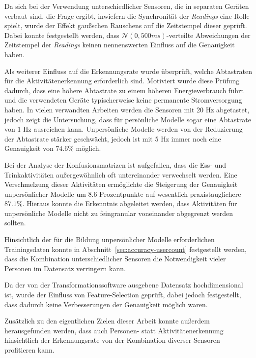 Da sich bei der Verwendung unterschiedlicher Sensoren, die in separaten Geräten verbaut sind, die Frage ergibt, inwiefern die Synchronität der \textit{Readings} eine Rolle spielt, wurde der Effekt gaußschen Rauschens auf die Zeitstempel dieser geprüft. Dabei konnte festgestellt werden, dass $\mathcal{N}(0, 500ms)$-verteilte Abweichungen der Zeitstempel der \textit{Readings} keinen nennenswerten Einfluss auf die Genauigkeit haben.

Als weiterer Einfluss auf die Erkennungsrate wurde überprüft, welche Abtastraten für die Aktivitätenerkennung erforderlich sind. Motiviert wurde diese Prüfung dadurch, dass eine höhere Abtastrate zu einem höheren Energieverbrauch führt und die verwendeten Geräte typischerweise keine permanente Stromversorgung haben. In vielen verwandten Arbeiten werden die Sensoren mit 20 Hz abgetastet, jedoch zeigt die Untersuchung, dass für persönliche Modelle sogar eine Abtastrate von 1 Hz ausreichen kann. Unpersönliche Modelle werden von der Reduzierung der Abtastrate stärker geschwächt, jedoch ist mit 5 Hz immer noch eine Genauigkeit von $74.6 \%$ möglich.

Bei der Analyse der Konfusionsmatrizen ist aufgefallen, dass die Ess- und Trinkaktivitäten außergewöhnlich oft untereinander verwechselt werden. Eine Verschmelzung dieser Aktivitäten ermöglichte die Steigerung der Genauigkeit unpersönlicher Modelle um $8.6$ Prozentpunkte auf wesentlich praxistauglichere $87.1 \%$. Hieraus konnte die Erkenntnis abgeleitet werden, dass Aktivitäten für unpersönliche Modelle nicht zu feingranular voneinander abgegrenzt werden sollten.

Hinsichtlich der für die Bildung unpersönlicher Modelle erforderlichen Trainingsdaten konnte in Abschnitt~\ref{sec:accuracy-usercount} festgestellt werden, dass die Kombination unterschiedlicher Sensoren die Notwendigkeit vieler Personen im Datensatz verringern kann. 

Da der von der Transformationssoftware ausgebene Datensatz hochdimensional ist, wurde der Einfluss von Feature-Selection geprüft, dabei jedoch festgestellt, dass dadurch keine Verbesserungen der Genauigkeit möglich waren.

Zusätzlich zu den eigentlichen Zielen dieser Arbeit konnte außerdem herausgefunden werden, dass auch Personen- statt Aktivitätenerkennung hinsichtlich der Erkennungsrate von der Kombination diverser Sensoren profitieren kann.

